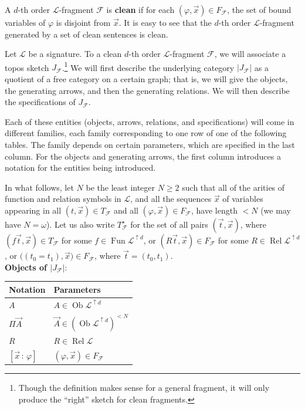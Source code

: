 \documentclass{amsart}
\newcommand\abs[2][]{#1\lvert{#2}#1\rvert}
\newcommand\cF{\mathcal{F}}
\newcommand\cL{\mathcal{L}}
\newcommand\defword[1]{{\boldmath \textbf{#1}}}
\newcommand\Fun{\operatorname{Fun}}
\newcommand\Ob{\operatorname{Ob}}
\newcommand\pbig[1]{\big({#1}\big)}
\renewcommand\phi{\varphi}
\newcommand\Rel{\operatorname{Rel}}
\newcommand\tolon{{\,:\,}}
\newcommand\up{\uparrow}
\newcommand\vA{\vek{A}}
\newcommand\vek[1]{{\vec{#1}}}
\newcommand\vt{\vek{t}}
\newcommand\vx{\vek{x}}
\theoremstyle{definition}
\theoremstyle{remark}
\theoremstyle{plainwithref}
\begin{document}
\begin{defn}
  A \( d \)-th order \( \cL \)-fragment \( \cF \) is \defword{clean} if for each \( (\phi, \vx) \in F_\cF \), the set of bound variables of \( \phi \) is disjoint from \( \vx \).
  It is easy to see that the \( d \)-th order \( \cL \)-fragment generated by a set of clean sentences is clean.
\end{defn}

\begin{defn} \label{defn:fragment-sketch}
  \def\arraystretch{1.3}

  Let \( \cL \) be a signature.
  To a clean \( d \)-th order \( \cL \)-fragment \( \cF \), we will associate a topos sketch \( J_\cF \).\footnote{%
    Though the definition makes sense for a general fragment, it will only produce the ``right'' sketch for clean fragments. %
  }
  We will first describe the underlying category \( \abs{J_\cF} \) as a quotient of a free category on a certain graph; that is, we will give the objects, the generating arrows, and then the generating relations.
  We will then describe the specifications of \( J_{\cF} \).

  Each of these entities (objects, arrows, relations, and specifications) will come in different families, each family corresponding to one row of one of the following tables.
  The family depends on certain parameters, which are specified in the last column.
  For the objects and generating arrows, the first column introduces a notation for the entities being introduced.

  In what follows, let \( N \) be the least integer \( N \ge 2 \) such that all of the arities of function and relation symbols in \( \cL \), and all the sequences \( \vx \) of variables appearing in all \( (t, \vx) \in T_\cF \) and all \( (\phi, \vx) \in F_\cF \), have length \( < N \) (we may have \( N = \omega \)).
  Let us also write \( T_\cF^\star \) for the set of all pairs \( (\vt, \vx) \), where \( (f \vt, \vx) \in T_\cF \) for some \( f \in \Fun \cL^{\up d} \), or \( (R \vt, \vx) \in F_\cF \) for some \( R \in \Rel \cL^{\up d} \), or \( \pbig{(t_0 = t_1), \vx} \in F_\cF \), where \( \vt = (t_0,t_1) \).
  \\

  \noindent
  \textbf{Objects of \( \abs{J_{\cF}} \)}:
  \begin{center}
    \begin{tabular}{l|l}
      Notation & Parameters \\
      \hline
      \( A \) & \( A \in \Ob \cL^{\up d} \) \\
      \( \Pi \vA \) & \( \vA \in (\Ob \cL^{\up d})^{< N} \) \\
      \( R \) & \( R \in \Rel \cL \) \\
      \( [\vx \tolon \phi] \) & \( (\phi, \vx) \in F_\cF \)
    \end{tabular}
  \end{center}


\end{defn}
\end{document}

